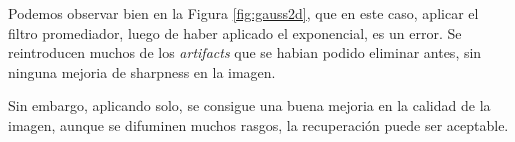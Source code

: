 Podemos observar bien en la Figura \ref{fig:gauss2d}, que en este caso, aplicar el filtro promediador, luego de haber aplicado el exponencial, es un error. 
Se reintroducen muchos de los \textit{artifacts} que se habian podido eliminar antes, sin ninguna mejoria de sharpness en la imagen. 

Sin embargo, aplicando solo, se consigue una buena mejoria en la calidad de la imagen, aunque se difuminen muchos rasgos, la recuperaci\'on puede ser aceptable.
